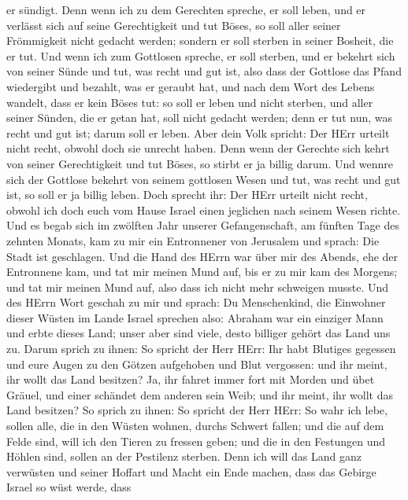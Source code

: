 er sündigt.  Denn wenn ich zu dem Gerechten spreche, er
soll leben, und er verlässt sich auf seine Gerechtigkeit und tut Böses,
so soll aller seiner Frömmigkeit nicht gedacht werden; sondern er soll
sterben in seiner Bosheit, die er tut.  Und wenn ich zum
Gottlosen spreche, er soll sterben, und er bekehrt sich von seiner Sünde
und tut, was recht und gut ist,  also dass der Gottlose das
Pfand wiedergibt und bezahlt, was er geraubt hat, und nach dem Wort des
Lebens wandelt, dass er kein Böses tut: so soll er leben und nicht
sterben,  und aller seiner Sünden, die er getan hat, soll
nicht gedacht werden; denn er tut nun, was recht und gut ist; darum soll
er leben.  Aber dein Volk spricht: Der HErr urteilt nicht
recht, obwohl doch sie unrecht haben.  Denn wenn der
Gerechte sich kehrt von seiner Gerechtigkeit und tut Böses, so stirbt er
ja billig darum.  Und wennre sich der Gottlose bekehrt von
seinem gottlosen Wesen und tut, was recht und gut ist, so soll er ja
billig leben.  Doch sprecht ihr: Der HErr urteilt nicht
recht, obwohl ich doch euch vom Hause Israel einen jeglichen nach seinem
Wesen richte.  Und es begab sich im zwölften Jahr unserer
Gefangenschaft, am fünften Tage des zehnten Monats, kam zu mir ein
Entronnener von Jerusalem und sprach: Die Stadt ist geschlagen.
 Und die Hand des HErrn war über mir des Abends, ehe der
Entronnene kam, und tat mir meinen Mund auf, bis er zu mir kam des
Morgens; und tat mir meinen Mund auf, also dass ich nicht mehr schweigen
musste.  Und des HErrn Wort geschah zu mir und sprach:
 Du Menschenkind, die Einwohner dieser Wüsten im Lande
Israel sprechen also: Abraham war ein einziger Mann und erbte dieses
Land; unser aber sind viele, desto billiger gehört das Land uns zu.
 Darum sprich zu ihnen: So spricht der Herr HErr: Ihr habt
Blutiges gegessen und eure Augen zu den Götzen aufgehoben und Blut
vergossen: und ihr meint, ihr wollt das Land besitzen?  Ja,
ihr fahret immer fort mit Morden und übet Gräuel, und einer schändet dem
anderen sein Weib; und ihr meint, ihr wollt das Land besitzen?
 So sprich zu ihnen: So spricht der Herr HErr: So wahr ich
lebe, sollen alle, die in den Wüsten wohnen, durchs Schwert fallen; und
die auf dem Felde sind, will ich den Tieren zu fressen geben; und die in
den Festungen und Höhlen sind, sollen an der Pestilenz sterben.
 Denn ich will das Land ganz verwüsten und seiner Hoffart
und Macht ein Ende machen, dass das Gebirge Israel so wüst werde, dass
